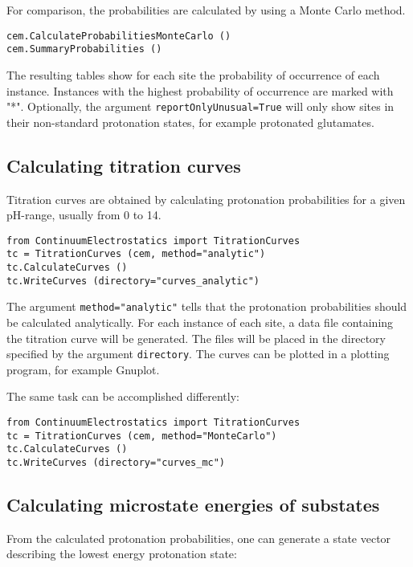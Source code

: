\documentclass[a4paper,11pt]{article}
\begin{document}
{\bigskip
For comparison, the probabilities are calculated by using a Monte Carlo method. 

{\footnotesize \begin{lstlisting}
cem.CalculateProbabilitiesMonteCarlo ()
cem.SummaryProbabilities ()
\end{lstlisting} }

\bigskip
The resulting tables show for each site the probability of occurrence of each instance. 
%
Instances with the highest probability of occurrence are marked with "*".
%
Optionally, the argument \texttt{reportOnlyUnusual=True} will only show sites 
in their non-standard  protonation states, for example protonated glutamates.


\subsection{Calculating titration curves}
Titration curves are obtained by calculating protonation probabilities for a given pH-range, 
usually from 0 to 14.

{\footnotesize \begin{lstlisting}
from ContinuumElectrostatics import TitrationCurves
tc = TitrationCurves (cem, method="analytic")
tc.CalculateCurves ()
tc.WriteCurves (directory="curves_analytic")
\end{lstlisting} }

\bigskip
The argument \texttt{method="analytic"} tells that the protonation probabilities should be
calculated analytically.
%
For each instance of each site, a data file containing the titration curve will be generated.
%
The files will be placed in the directory specified by the argument \texttt{directory}.
%
The curves can be plotted in a plotting program, for example Gnuplot.

\bigskip
The same task can be accomplished differently:

{\footnotesize \begin{lstlisting}
from ContinuumElectrostatics import TitrationCurves
tc = TitrationCurves (cem, method="MonteCarlo")
tc.CalculateCurves ()
tc.WriteCurves (directory="curves_mc")
\end{lstlisting} }


\subsection{Calculating microstate energies of substates}
From the calculated protonation probabilities, one can generate a state vector describing
the lowest energy protonation state:

}
\end{document}
